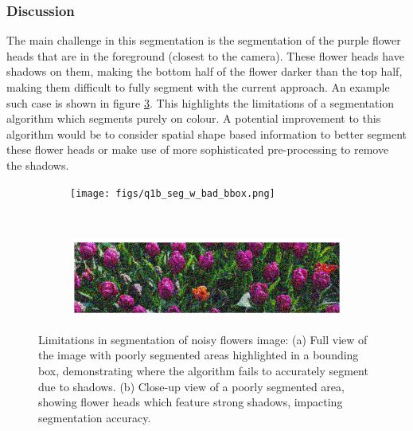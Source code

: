 \documentclass[11pt]{article}
\begin{document}
\subsubsection{Discussion}
The main challenge in this segmentation is the segmentation of the purple flower heads that are in the foreground (closest to the camera). These flower heads have shadows on them, making the bottom half of the flower darker than the top half, making them difficult to fully segment with the current approach. An example such case is shown in figure \ref{fig:q1b_seg_lim}. This highlights the limitations of a segmentation algorithm which segments purely on colour. A potential improvement to this algorithm would be to consider spatial shape based information to better segment these flower heads or make use of more sophisticated pre-processing to remove the shadows.
\begin{figure}[H]
    \centering
    \begin{subfigure}{.8\textwidth}
        \centering
        \texttt{[image: figs/q1b\_seg\_w\_bad\_bbox.png]}
        \caption{}  %
        \label{fig:q1b_bad_seg_w_bbox}
    \end{subfigure}\\ %
    \begin{subfigure}{.8\textwidth}
        \centering
        \includegraphics[width=\linewidth]{figs/q1b_bad_zoomed_region.png}
        \caption{}  %
        \label{fig:q1b_bad_zoom}
    \end{subfigure}
    \caption{Limitations in segmentation of noisy flowers image: (a) Full view of the image with poorly segmented areas highlighted in a bounding box, demonstrating where the algorithm fails to accurately segment due to shadows. (b) Close-up view of a poorly segmented area, showing flower heads which feature strong shadows, impacting segmentation accuracy.}
    \label{fig:q1b_seg_lim}
\end{figure}
\end{document}

